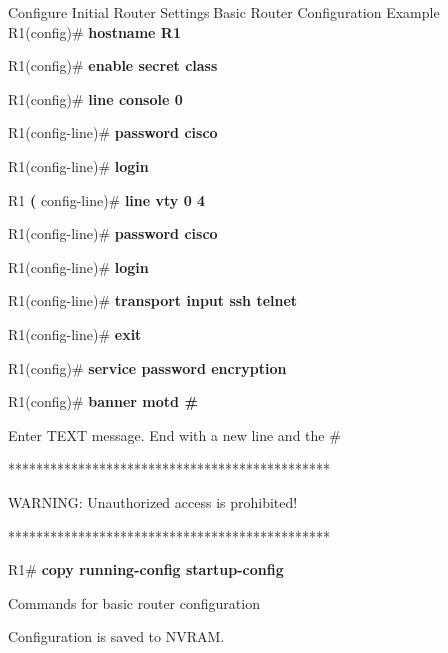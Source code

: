 \documentclass[
  ignorenonframetext,
]{beamer}
\begin{document}
\begin{frame}{Configure Initial Router SettingsBasic Router
Configuration Example}
\label{configure-initial-router-settings-basic-router-configuration-example}
R1(config)\# \textbf{hostname R1}

R1(config)\# \textbf{enable secret class}

R1(config)\# \textbf{line console 0}

R1(config-line)\# \textbf{password cisco}

R1(config-line)\# \textbf{login}

R1 \textbf{(} config-line)\# \textbf{line vty 0 4}

R1(config-line)\# \textbf{password cisco}

R1(config-line)\# \textbf{login}

R1(config-line)\# \textbf{transport input ssh telnet}

R1(config-line)\# \textbf{exit}

R1(config)\# \textbf{service password encryption}

R1(config)\# \textbf{banner motd \#}

Enter TEXT message. End with a new line and the \#

**********************************************

WARNING: Unauthorized access is prohibited!

**********************************************

R1\# \textbf{copy running-config startup-config}

{Commands for basic router configuration}

{Configuration is saved to NVRAM.}

\end{frame}
\end{document}
